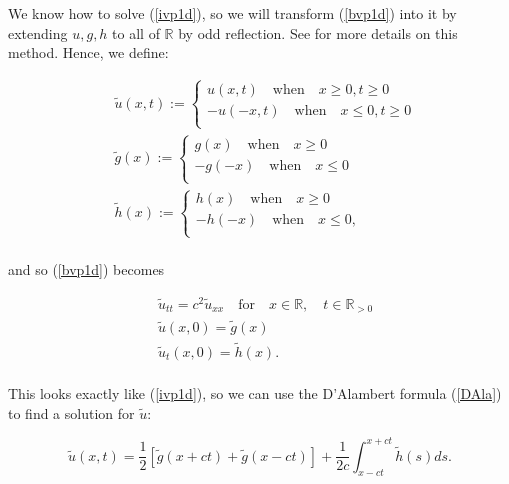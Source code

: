 \documentclass[a4paper, 12pt]{article}
\numberwithin{equation}{section}
\begin{document}
We know how to solve (\ref{ivp1d}), so we will transform (\ref{bvp1d}) into it by extending $u,g,h$ to all of $\mathbb{R}$ by odd reflection. See \cite{Ev} for more details on this method.
Hence, we define:

\begin{equation*}
    \begin{aligned}
        &\tilde{u}(x,t):=
        \begin{cases}
            u(x,t) \quad \textrm{when} \quad x \ge 0, t \ge 0\\
            -u(-x,t) \quad \textrm{when} \quad x \le 0, t \ge 0\\
        \end{cases}
        \\
        &\tilde{g}(x):=
        \begin{cases}
            g(x) \quad \textrm{when} \quad x \ge 0\\
            -g(-x) \quad \textrm{when} \quad x \le 0\\
        \end{cases}
        \\
        &\tilde{h}(x):=
        \begin{cases}
            h(x) \quad \textrm{when} \quad x \ge 0\\
            -h(-x) \quad \textrm{when} \quad x \le 0,\\
        \end{cases}
    \end{aligned}
\end{equation*}
\\

and so (\ref{bvp1d}) becomes 

\begin{align*}
    &\tilde{u}_{tt}=c^2\tilde{u}_{xx} \quad \textrm {for} \quad x \in \mathbb{R}, \quad t \in \mathbb{R}_{>0} \\
    &\tilde{u}(x,0)=\tilde{g}(x)\\
    &\tilde{u}_t(x,0)=\tilde{h}(x).\\
\end{align*}

This looks exactly like (\ref{ivp1d}), so we can use the D'Alambert formula (\ref{DAla}) to find a solution for $\tilde{u}$:

\begin{equation*}
    \tilde{u}(x,t)=\frac{1}{2}\left[\tilde{g}(x+ct)+\tilde{g}(x-ct)\right]+\frac{1}{2c}\int^{x+ct}_{x-ct}\tilde{h}(s)ds.
\end{equation*}
\end{document}
